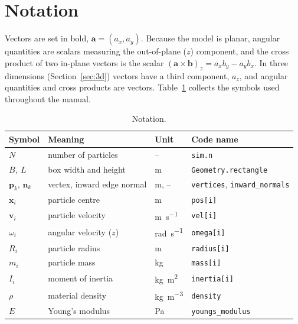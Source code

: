 \section{Notation}
\label{sec:notation}

Vectors are set in bold, $\mathbf{a}=(a_{x},a_{y})$.  Because the model is
planar, angular quantities are scalars measuring the out-of-plane
($z$) component, and the cross product of two in-plane vectors is the scalar
$(\mathbf{a}\times\mathbf{b})_{z}=a_{x}b_{y}-a_{y}b_{x}$.
In three dimensions (Section~\ref{sec:3d}) vectors have a third component, $a_{z}$, and angular quantities and cross products are vectors.
Table~\ref{tab:notation} collects the symbols used throughout the manual.

\begin{table}[htbp]
  \centering
  \small
  \caption{Notation.}
  \label{tab:notation}
  \begin{tabular}{llll}
    \toprule
    Symbol & Meaning & Unit & Code name \\
    \midrule
    $N$              & number of particles              & --                   & \texttt{sim.n} \\
    $B,\ L$          & box width and height             & \unit{\metre}        & \texttt{Geometry.rectangle} \\
    $\mathbf{p}_{k}$, $\mathbf{n}_{k}$ & vertex, inward edge normal & \unit{\metre}, -- & \texttt{vertices}, \texttt{inward\_normals} \\
    $\mathbf{x}_{i}$ & particle centre                  & \unit{\metre}        & \texttt{pos[i]} \\
    $\mathbf{v}_{i}$ & particle velocity                & \unit{\metre\per\second} & \texttt{vel[i]} \\
    $\omega_{i}$     & angular velocity ($z$)           & \unit{\radian\per\second} & \texttt{omega[i]} \\
    $R_{i}$          & particle radius                  & \unit{\metre}        & \texttt{radius[i]} \\
    $m_{i}$          & particle mass                    & \unit{\kilogram}     & \texttt{mass[i]} \\
    $I_{i}$          & moment of inertia                & \unit{\kilogram\metre\squared} & \texttt{inertia[i]} \\
    $\rho$           & material density                 & \unit{\kilogram\per\cubic\metre} & \texttt{density} \\
    $E$              & Young's modulus                  & \unit{\pascal}       & \texttt{youngs\_modulus} \\

\end{tabular}
\end{table}
